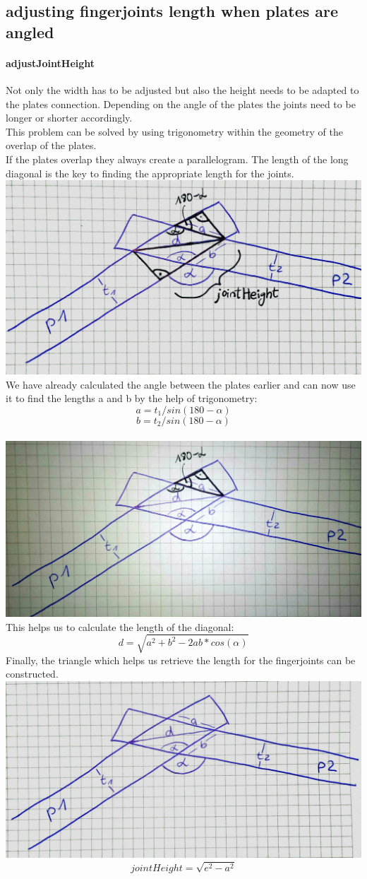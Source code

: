\documentclass[../ClassicThesis.tex]{subfiles}
\begin{document}
\subsection{adjusting fingerjoints length when plates are angled}
    \paragraph{adjustJointHeight}
    Not only the width has to be adjusted but also the height needs to be adapted to the plates connection. Depending on the angle of the plates the joints need to be longer or shorter accordingly.\\
    This problem can be solved by using trigonometry within the geometry of the overlap of the plates.\\
    If the plates overlap they always create a parallelogram. The length of the long diagonal is the key to finding the appropriate length for the joints.\\
    \includegraphics[width=0.5\columnwidth]{Images/06-2-joints-newJointHeight1.jpg}\\
    We have already calculated the angle between the plates earlier and can now use it to find the lengths a and b by the help of trigonometry:\\
    $$ a = t_1 / sin(180 - \alpha)$$
    $$ b = t_2 / sin(180 - \alpha)$$\\
    \includegraphics[width=0.5\columnwidth]{Images/06-2-joints-newJointHeight2.jpg}\\
    This helps us to calculate the length of the diagonal:
    $$ d = \sqrt{a^2 + b^2 - 2ab * cos(\alpha)}$$
    Finally, the triangle which helps us retrieve the length for the fingerjoints can be constructed. \\
    \includegraphics[width=0.5\columnwidth]{Images/06-2-joints-newJointHeight3.jpg}\\
    $$ jointHeight = \sqrt{e^2 - a^2} $$
    
\end{document}
